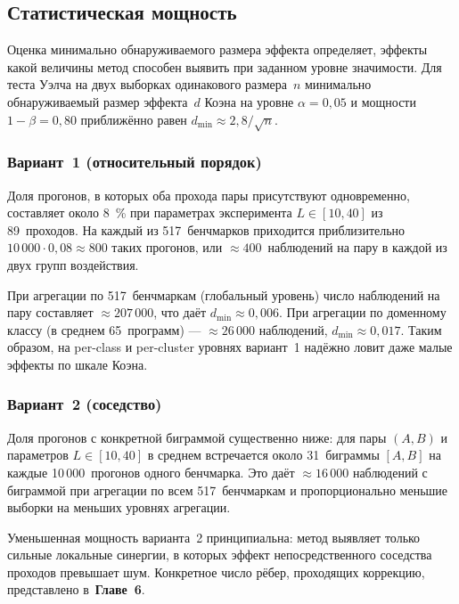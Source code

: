 \subsection{Статистическая мощность}

Оценка минимально обнаруживаемого размера эффекта определяет, эффекты какой величины метод способен выявить при заданном уровне значимости. Для теста Уэлча на двух выборках одинакового размера~$n$ минимально обнаруживаемый размер эффекта~$d$ Коэна на уровне $\alpha = 0{,}05$ и мощности $1 - \beta = 0{,}80$ приближённо равен $d_{\min} \approx 2{,}8 / \sqrt{n}$.

\subsubsection{Вариант~1 (относительный порядок)}

Доля прогонов, в которых оба прохода пары присутствуют одновременно, составляет около 8~\% при параметрах эксперимента $L \in [10, 40]$ из 89~проходов. На каждый из 517~бенчмарков приходится приблизительно $10\,000 \cdot 0{,}08 \approx 800$ таких прогонов, или $\approx 400$~наблюдений на пару в каждой из двух групп воздействия.

При агрегации по 517~бенчмаркам (глобальный уровень) число наблюдений на пару составляет $\approx 207\,000$, что даёт $d_{\min} \approx 0{,}006$. При агрегации по доменному классу (в среднем 65~программ) --- $\approx 26\,000$ наблюдений, $d_{\min} \approx 0{,}017$. Таким образом, на per-class и per-cluster уровнях вариант~1 надёжно ловит даже малые эффекты по шкале Коэна.

\subsubsection{Вариант~2 (соседство)}

Доля прогонов с конкретной биграммой существенно ниже: для пары $(A, B)$ и параметров $L \in [10, 40]$ в среднем встречается около 31~биграммы $[A, B]$ на каждые 10\,000~прогонов одного бенчмарка. Это даёт $\approx 16\,000$ наблюдений с биграммой при агрегации по всем 517~бенчмаркам и пропорционально меньшие выборки на меньших уровнях агрегации.

Уменьшенная мощность варианта~2 принципиальна: метод выявляет только сильные локальные синергии, в которых эффект непосредственного соседства проходов превышает шум. Конкретное число рёбер, проходящих коррекцию, представлено в~\textbf{Главе~6}.

\newpage

